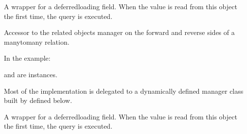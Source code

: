 \documentclass[letterpaper,10pt,english]{sphinxmanual}
\begin{document}
\begin{fulllineitems}
\begin{fulllineitems}
\label{\detokenize{app:app.models.link.first_interface}}
\pysigstartsignatures
{}
\pysigstopsignatures
\sphinxAtStartPar
A wrapper for a deferred\sphinxhyphen{}loading field. When the value is read from this
object the first time, the query is executed.

\end{fulllineitems}


\begin{fulllineitems}
\label{\detokenize{app:app.models.link.modele_io_mapping_set}}
\pysigstartsignatures
{}
\pysigstopsignatures
\sphinxAtStartPar
Accessor to the related objects manager on the forward and reverse sides of
a many\sphinxhyphen{}to\sphinxhyphen{}many relation.

\sphinxAtStartPar
In the example:

\begin{sphinxVerbatim}[commandchars=\\\{\}]
 
       
\end{sphinxVerbatim}

\sphinxAtStartPar
{} and  are 
instances.

\sphinxAtStartPar
Most of the implementation is delegated to a dynamically defined manager
class built by  defined below.

\end{fulllineitems}


\begin{fulllineitems}
\label{\detokenize{app:app.models.link.nom_link}}
\pysigstartsignatures
{}
\pysigstopsignatures
\sphinxAtStartPar
A wrapper for a deferred\sphinxhyphen{}loading field. When the value is read from this
object the first time, the query is executed.


\end{fulllineitems}
\end{fulllineitems}
\end{document}
